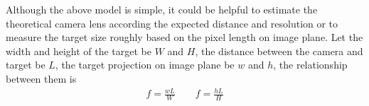 %

Although the above model is simple, it could be helpful to estimate the theoretical camera lens according the expected distance and resolution or to measure the target size roughly based on the pixel length on image plane. Let the width and height of the target be $W$ and $H$, the distance between the camera and target be $L$, the target projection on image plane be $w$ and $h$, the relationship between them is  
\begin{align}
f=\frac{wL}{W} \qquad f=\frac{hL}{H}
\end{align}

